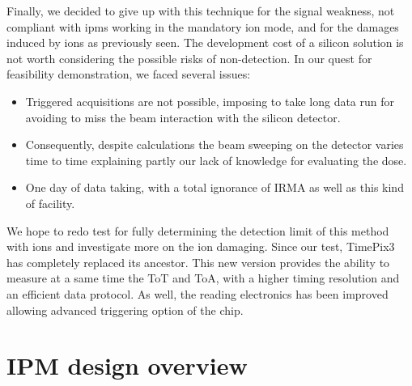 \begin{refsection}
  Finally, we decided to give up with this technique for the signal weakness, not compliant with \acrshort{ipm}s working in the mandatory ion mode, and for the damages induced by ions as previously seen. The development cost of a silicon solution is not worth considering the possible risks of non-detection.
  In our quest for feasibility demonstration, we faced several issues:
  \begin{itemize}
    \item Triggered acquisitions are not possible, imposing to take long data run for avoiding to miss the beam interaction with the silicon detector.
    \item Consequently, despite calculations the beam sweeping on the detector varies time to time explaining partly our lack of knowledge for evaluating the dose.
    \item One day of data taking, with a total ignorance of IRMA as well as this kind of facility.
  \end{itemize}

  We hope to redo test for fully determining the detection limit of this method with ions and investigate more on the ion damaging.
  Since our test, TimePix3 has completely replaced its ancestor. This new version provides the ability to measure at a same time the ToT and ToA, with a higher timing resolution and an efficient data protocol. As well, the reading electronics has been improved allowing advanced triggering option of the chip.



  \section{IPM design overview}

\end{refsection}
